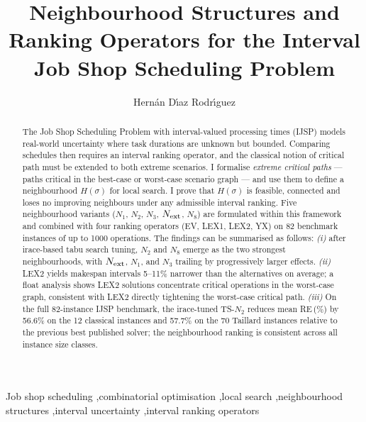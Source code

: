 \documentclass[preprint,12pt]{elsarticle}
\begin{document}
\begin{frontmatter}


\title{Neighbourhood Structures and Ranking Operators for the Interval Job Shop Scheduling Problem}

\author[uo]{Hern\'an D\'{\i}az Rodr\'{\i}guez}


\begin{abstract}
The Job Shop Scheduling Problem with interval-valued processing times (IJSP) models real-world uncertainty where task durations are unknown but bounded. Comparing schedules then requires an interval ranking operator, and the classical notion of critical path must be extended to both extreme scenarios. I formalise \emph{extreme critical paths} --- paths critical in the best-case or worst-case scenario graph --- and use them to define a neighbourhood $H(\sigma)$ for local search. I prove that $H(\sigma)$ is feasible, connected and loses no improving neighbours under any admissible interval ranking. Five neighbourhood variants ($N_1$, $N_2$, $N_3$, $N_{\rm ext}$, $N_8$) are formulated within this framework and combined with four ranking operators (EV, LEX1, LEX2, YX) on 82 benchmark instances of up to 1000 operations. The findings can be summarised as follows: \emph{(i)} after irace-based tabu search tuning, $N_2$ and $N_8$ emerge as the two strongest neighbourhoods, with $N_{\rm ext}$, $N_1$, and $N_3$ trailing by progressively larger effects. \emph{(ii)} LEX2 yields makespan intervals 5--11\% narrower than the alternatives on average; a float analysis shows LEX2 solutions concentrate critical operations in the worst-case graph, consistent with LEX2 directly tightening the worst-case critical path. \emph{(iii)} On the full 82-instance IJSP benchmark, the irace-tuned TS-$N_2$ reduces mean RE\,(\%) by 56.6\% on the 12 classical instances and 57.7\% on the 70 Taillard instances relative to the previous best published solver; the neighbourhood ranking is consistent across all instance size classes.
\end{abstract}


\begin{keyword}
Job shop scheduling \sep combinatorial optimisation \sep local search \sep neighbourhood structures \sep interval uncertainty \sep interval ranking operators
\end{keyword}

\end{frontmatter}
\end{document}
